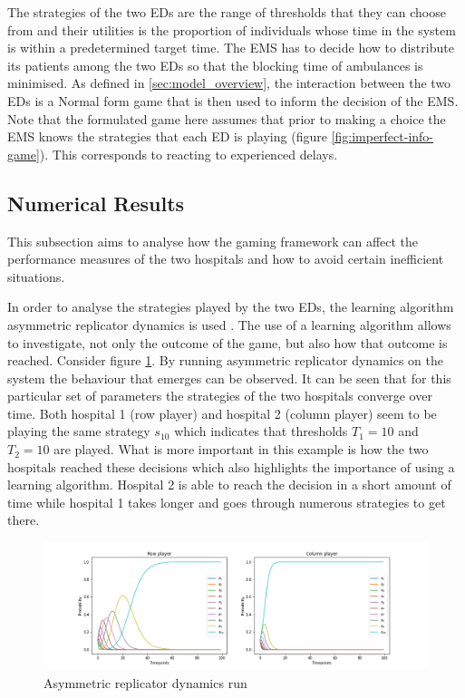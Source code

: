 The strategies of the two EDs are the range of thresholds that they can choose
from and their utilities is the proportion of individuals whose time in the 
system is within a predetermined target time.
The EMS has to decide how to distribute its patients among the two EDs so that 
the blocking time of ambulances is minimised. 
As defined in \ref{sec:model_overview}, the interaction between the two EDs 
is a Normal form game that is then used to inform the decision of the EMS.
Note that the formulated game here assumes that prior to making a choice the 
EMS knows the strategies that each ED is playing (figure 
\ref{fig:imperfect-info-game}). This corresponds to reacting to experienced delays.

\subsection{Numerical Results}

This subsection aims to analyse how the gaming framework can affect the 
performance measures of the two hospitals and how to avoid certain inefficient 
situations.

In order to analyse the strategies played by the two EDs, the learning algorithm
asymmetric replicator dynamics is used \cite{asymmetricreplicatordynamics}.
The use of a learning algorithm allows to investigate, not only the outcome of 
the game, but also how that outcome is reached.
Consider figure \ref{fig:ard-by-itself}. 
By running asymmetric replicator dynamics on the system the behaviour that 
emerges can be observed.
It can be seen that for this particular set of parameters the strategies of 
the two hospitals converge over time. 
Both hospital 1 (row player) and hospital 2 (column player) seem to be playing 
the same strategy \(s_10\) which indicates that thresholds \(T_1 = 10\) and 
\(T_2 = 10\) are played.
What is more important in this example is how the two hospitals reached these
decisions which also highlights the importance of using a learning algorithm.
Hospital 2 is able to reach the decision in a short amount of time while 
hospital 1 takes longer and goes through numerous strategies to get there.

\begin{figure}[H]
    \centering
    \includegraphics[scale=0.4, trim=120 0 120 0]{imgs/asymmetric_rd/asymmetric_rd.png}
    \caption{Asymmetric replicator dynamics run}
    \label{fig:ard-by-itself}
\end{figure}


